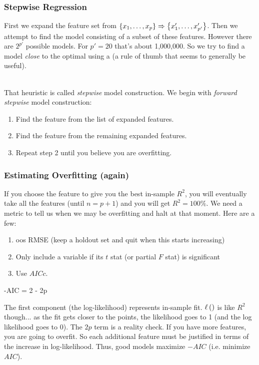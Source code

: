 \documentclass[handout]{beamer}
\begin{document}
\begin{frame}\frametitle{Stepwise Regression}

First we expand the feature set from $\left\{x_1, \ldots, x_p\right\} \Rightarrow \left\{x'_1, \ldots, x'_{p'}\right\}$. \pause Then we attempt to find the  model consisting of a subset of these features. However there are $2^{p'}$ possible models. For $p'=20$ that's about 1,000,000. \pause So we try to find a model \textit{close} to the optimal using a  (a rule of thumb that seems to generally be useful).\\~\\ \pause

That heuristic is called \emph{stepwise} model construction. \pause We begin with \emph{forward stepwise} model construction: \pause

\begin{enumerate}
\item Find the  feature from the list of expanded features.\pause
\item Find the  feature from the remaining expanded features.\pause
\item Repeat step 2 until you believe you are overfitting.\pause
\end{enumerate}




\end{frame}

\begin{frame}\frametitle{Estimating Overfitting (again)}
\small
If you choose the feature to give you the best in-sample $R^2$, you will eventually take all the features (until $n = p+1$) and you will get $R^2 = 100\%$. We need a metric to tell us when we may be overfitting and halt at that moment. \pause Here are a few:

\begin{enumerate}
\item oos RMSE (keep a holdout set and quit when this starts increasing) \pause
\item Only include a variable if its $t$ stat (or partial $F$ stat) is significant \pause
\item Use $AICc$.
\end{enumerate}

\beqn
-AIC = 2\loglik{\betahat; \y, \x} - 2p
\eeqn

The first component (the log-likelihood) represents in-sample fit. \pause $\ell\left(\right)$ is like $R^2$ though... as the fit gets closer to the points, the likelihood goes to 1 (and the log likelihood goes to 0). \pause The $2p$ term is a reality check. If you have more features, you are going to overfit. So each additional feature must be justified in terms of the increase in log-likelihood. \pause Thus, good models maximize $-AIC$ (i.e. minimize $AIC$).\\~\\


	

\end{frame}
\end{document}
